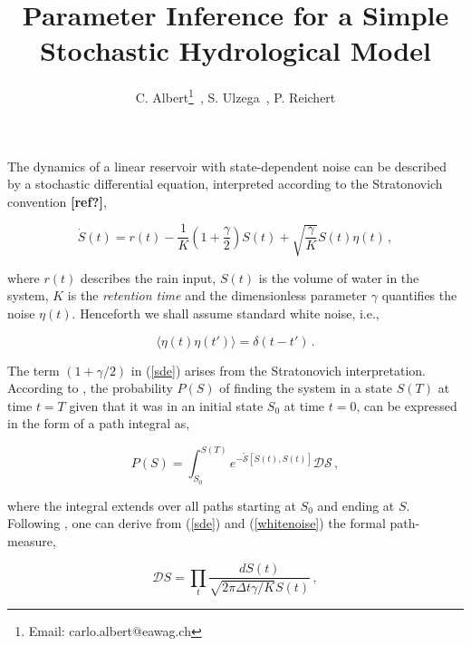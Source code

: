 \documentclass[11pt, a4paper]{article}
\begin{document}
\title{Parameter Inference for a Simple Stochastic Hydrological Model}

\author{C. Albert\thanks{\noindent Email: carlo.albert@eawag.ch} \,,
S. Ulzega \,, P. Reichert}
\maketitle

The dynamics of a linear reservoir with state-dependent noise can be described by a stochastic differential equation, interpreted according to the Stratonovich convention \textbf{[ref?]},

\begin{equation}\label{sde}
\dot{S}(t) = r(t) - \frac{1}{K}\left(1+\frac{\gamma}{2}\right) S(t)
+
\sqrt{\frac{\gamma}{K}} S(t){\eta}(t)\,,
\end{equation}

where $r(t)$ describes the rain input, $S(t)$ is the volume of water in the system, $K$ is the {\em retention time} and the dimensionless parameter $\gamma$ quantifies the noise ${\eta}(t)$. Henceforth we shall assume standard white noise, i.e.,

\begin{equation}\label{whitenoise}
\langle\eta(t)\eta(t')\rangle = \delta(t-t')\,.
\end{equation}

The term $\left(1+\gamma/2\right)$ in (\ref{sde}) arises from the Stratonovich interpretation. According to \cite{lau_2007_StateDepDiff}, the probability $P(S)$ of finding the system in a state $S(T)$ at time $t = T$ given that it was in an initial state $S_0$ at time $t = 0$, can be expressed in the form of a path integral as,

\begin{equation}\label{pathint}
P(S) = \int_{S_0}^{S(T)} e^{-\tilde{\mathcal S}[\dot{S}(t),S(t)]} \mathcal{DS} \,,
\end{equation}

where the integral extends over all paths starting at $S_0$ and ending at $S$. Following \cite{lau_2007_StateDepDiff}, one can derive from (\ref{sde}) and (\ref{whitenoise}) the formal path-measure,

\begin{equation}\label{pathmeasure}
{\mathcal DS}
=
\prod_{t}
\frac{dS(t)}{\sqrt{2\pi \mathit{\Delta t} \gamma/K }S(t)}\,,
\end{equation}
\end{document}
